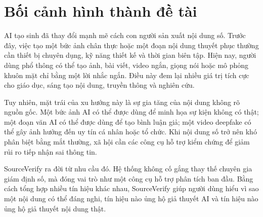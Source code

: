 \section{Bối cảnh hình thành đề tài}
AI tạo sinh đã thay đổi mạnh mẽ cách con người sản xuất nội dung số. Trước đây, việc tạo một bức ảnh chân thực hoặc một đoạn nội dung thuyết phục thường cần thiết bị chuyên dụng, kỹ năng thiết kế và thời gian biên tập. Hiện nay, người dùng phổ thông có thể tạo ảnh, bài viết, video ngắn, giọng nói hoặc mô phỏng khuôn mặt chỉ bằng một lời nhắc ngắn. Điều này đem lại nhiều giá trị tích cực cho giáo dục, sáng tạo nội dung, truyền thông và nghiên cứu.

Tuy nhiên, mặt trái của xu hướng này là sự gia tăng của nội dung không rõ nguồn gốc. Một bức ảnh AI có thể được dùng để minh họa sự kiện không có thật; một đoạn văn AI có thể được dùng để tạo bình luận giả; một video deepfake có thể gây ảnh hưởng đến uy tín cá nhân hoặc tổ chức. Khi nội dung số trở nên khó phân biệt bằng mắt thường, xã hội cần các công cụ hỗ trợ kiểm chứng để giảm rủi ro tiếp nhận sai thông tin.

SourceVerify ra đời từ nhu cầu đó. Hệ thống không cố gắng thay thế chuyên gia giám định số, mà đóng vai trò như một công cụ hỗ trợ phân tích ban đầu. Bằng cách tổng hợp nhiều tín hiệu khác nhau, SourceVerify giúp người dùng hiểu vì sao một nội dung có thể đáng nghi, tín hiệu nào ủng hộ giả thuyết AI và tín hiệu nào ủng hộ giả thuyết nội dung thật.

